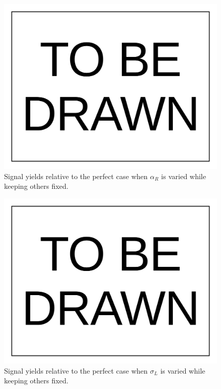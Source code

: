 \documentclass[10pt,a4paper,onecolumn]{article}
\begin{document}
\begin{figure}
\includegraphics[width=110mm]{ToBeDrawn.pdf}
\caption{Signal yields relative to the perfect case when $\alpha_R$ is varied while keeping others fixed.}
\label{Figure_RelativeYieldChangingAlphaROnly}
\end{figure}

\begin{figure}
\includegraphics[width=110mm]{ToBeDrawn.pdf}
\caption{Signal yields relative to the perfect case when $\sigma_L$ is varied while keeping others fixed.}
\label{Figure_RelativeYieldChangingSigmaLOnly}
\end{figure}
\end{document}
